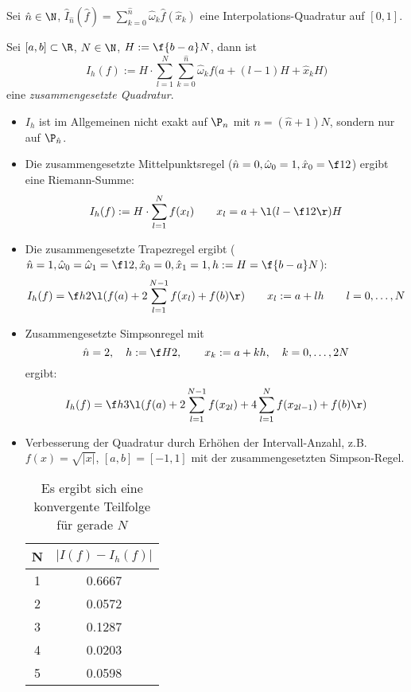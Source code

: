 \documentclass[11pt]{scrbook}
\begin{document}
\begin{df}
	\label{2.13}
	Sei $\hat n \in \N$, $\hat I_{\hat n}(\hat f) = \sum_{k=0}^{\hat n}\hat \omega_k \hat f(\hat x_k)$ eine Interpolations-Quadratur auf $[0,1]$.

	Sei $[a,b]\subset \R$, $N\in \N$, $H:= \f {b-a}N$, dann ist
	\[
		I_h (f) := H \cdot \sum_{l=1}^N \sum_{k=0}^{\hat n}\hat \omega_k f\Big(a+(l-1)H + \hat x_k H\Big)
	\]
	eine \emph{zusammengesetzte Quadratur}.
\end{df}

\begin{nt*}
	\begin{itemize}
		\item
			$I_h$ ist im Allgemeinen nicht exakt auf $\P_n$ mit $n=(\hat n + 1) N$, sondern nur auf $\P_{\hat n}$.
		\item
			Die zusammengesetzte Mittelpunktsregel ($\hat n = 0, \hat \omega_0 = 1, \hat x_0 = \f 12$) ergibt eine Riemann-Summe:
			\[
				I_h(f) := H \cdot \sum_{l=1}^N f (x_l) \qquad x_l = a + \l(l- \f 12\r) H
			\]
		\item
			Die zusammengesetzte Trapezregel ergibt ($\hat n = 1, \hat \omega_0 = \hat \omega_1 = \f 12, \hat x_0 = 0, \hat x_1 = 1, h := H = \f {b-a}N$):
			\[
				I_h(f) = \f h2 \l(f(a) + 2 \sum_{l=1}^{N-1}f(x_l) + f(b)\r) \qquad x_l := a+ lh \qquad l=0,\dotsc,N
			\]
		\item
			Zusammengesetzte Simpsonregel mit
			\[
				\hat n = 2, \quad h := \f H2, \qquad x_k := a+kh, \quad k=0,\dotsc, 2N
			\]
			ergibt:
			\[
				I_h(f) = \f h3 \l( f(a) + 2 \sum_{l=1}^{N-1}f(x_{2l}) + 4 \sum_{l=1}^{N}f(x_{2l-1}) + f(b)\r)
			\]
		\item
			Verbesserung der Quadratur durch Erhöhen der Intervall-Anzahl, z.B. $f(x)= \sqrt{|x|}$, $[a,b]=[-1,1]$ mit der zusammengesetzten Simpson-Regel.
			\begin{table}[H]
				\centering
				\caption{Es ergibt sich eine konvergente Teilfolge für gerade $N$}
				\begin{tabular}{c|c}
					N & $|I(f)-I_h(f)|$ \\ \hline
					1 & 0.6667 \\
					2 & 0.0572 \\
					3 & 0.1287 \\
					4 & 0.0203 \\
					5 & 0.0598
				\end{tabular}
			\end{table}
	\end{itemize}
\end{nt*}
\end{document}
